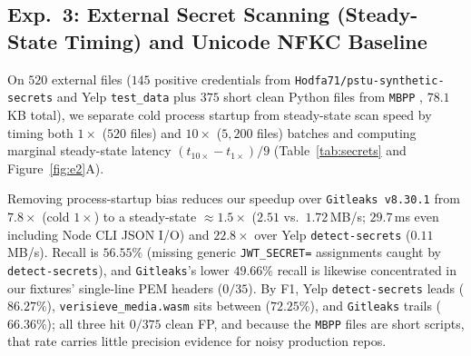 \documentclass{article}
\begin{document}
\subsection{Exp.~3: External Secret Scanning (Steady-State Timing) and Unicode NFKC Baseline}
\label{sec:exp3}

On $520$ external files ($145$ positive credentials from \texttt{Hodfa71/pstu-synthetic-secrets} and Yelp \texttt{test\_data} plus $375$ short clean Python files from \texttt{MBPP} \citep{austin2021mbpp}, $78.1$\,KB total), we separate cold process startup from steady-state scan speed by timing both $1\times$ ($520$ files) and $10\times$ ($5{,}200$ files) batches and computing marginal steady-state latency $(t_{10\times} - t_{1\times})/9$ (Table~\ref{tab:secrets} and Figure~\ref{fig:e2}A).

\begin{table}[t]
\caption{External secret scanning ($520$ files, $10\times$ steady-state throughput excluding process startup).}
\label{tab:secrets}
\vskip 0.08in
\begin{center}
\end{center}
\vskip -0.14in
\end{table}

Removing process-startup bias reduces our speedup over \texttt{Gitleaks v8.30.1} from $7.8\times$ (cold $1\times$) to a steady-state \textbf{$\approx 1.5\times$} ($2.51$ vs.\ $1.72$\,MB/s; $29.7$\,ms even including Node CLI JSON I/O) and \textbf{$22.8\times$} over Yelp \texttt{detect-secrets} ($0.11$\,MB/s). Recall is $56.55\%$ (missing generic \texttt{JWT\_SECRET=} assignments caught by \texttt{detect-secrets}), and \texttt{Gitleaks}'s lower $49.66\%$ recall is likewise concentrated in our fixtures' single-line PEM headers ($0/35$). By F1, Yelp \texttt{detect-secrets} leads ($86.27\%$), \texttt{verisieve\_media.wasm} sits between ($72.25\%$), and \texttt{Gitleaks} trails ($66.36\%$); all three hit $0/375$ clean FP, and because the \texttt{MBPP} files are short scripts, that rate carries little precision evidence for noisy production repos.
\end{document}
